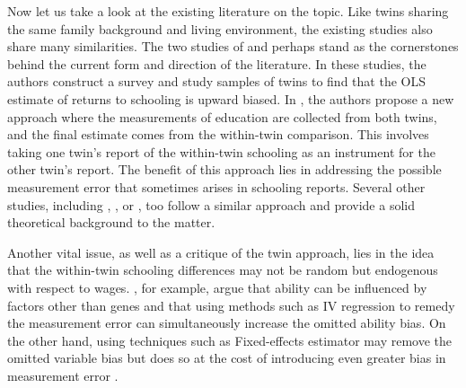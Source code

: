 Now let us take a look at the existing literature on the topic. Like twins sharing the same family background and living environment, the existing studies also share many similarities. The two studies of \cite{ashenfelter1994estimates} and \cite{ashenfelter1998income} perhaps stand as the cornerstones behind the current form and direction of the literature. In these studies, the authors construct a survey and study samples of twins to find that the \ac{OLS} estimate of returns to schooling is upward biased. In \cite{ashenfelter1994estimates}, the authors propose a new approach where the measurements of education are collected from both twins, and the final estimate comes from the within-twin comparison. This involves taking one twin's report of the within-twin schooling as an instrument for the other twin's report. The benefit of this approach lies in addressing the possible measurement error that sometimes arises in schooling reports. Several other studies, including \cite{behrman1994endowments}, \cite{isacsson1999estimates}, or \cite{bonjour2003returns}, too follow a similar approach and provide a solid theoretical background to the matter.

Another vital issue, as well as a critique of the twin approach, lies in the idea that the within-twin schooling differences may not be random but endogenous with respect to wages. \cite{bound1999double}, for example, argue that ability can be influenced by factors other than genes and that using methods such as \ac{IV} regression to remedy the measurement error can simultaneously increase the omitted ability bias. On the other hand, using techniques such as Fixed-effects estimator may remove the omitted variable bias but does so at the cost of introducing even greater bias in measurement error \citep{ning2005economic}.




